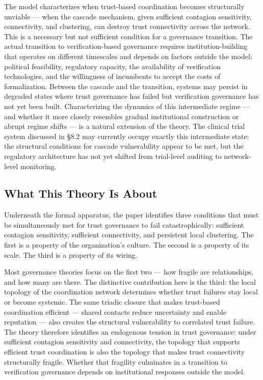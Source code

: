 \documentclass[11pt,a4paper]{article}
\begin{document}
The model characterizes when trust-based coordination becomes structurally unviable --- when the cascade mechanism, given sufficient contagion sensitivity, connectivity, and clustering, can destroy trust connectivity across the network. This is a necessary but not sufficient condition for a governance transition. The actual transition to verification-based governance requires institution-building that operates on different timescales and depends on factors outside the model: political feasibility, regulatory capacity, the availability of verification technologies, and the willingness of incumbents to accept the costs of formalization. Between the cascade and the transition, systems may persist in degraded states where trust governance has failed but verification governance has not yet been built. Characterizing the dynamics of this intermediate regime --- and whether it more closely resembles gradual institutional construction or abrupt regime shifts --- is a natural extension of the theory. The clinical trial system discussed in \S8.2 may currently occupy exactly this intermediate state: the structural conditions for cascade vulnerability appear to be met, but the regulatory architecture has not yet shifted from trial-level auditing to network-level monitoring.

\subsection{What This Theory Is About}

Underneath the formal apparatus, the paper identifies three conditions that must be simultaneously met for trust governance to fail catastrophically: sufficient contagion sensitivity, sufficient connectivity, and persistent local clustering. The first is a property of the organization's culture. The second is a property of its scale. The third is a property of its wiring.

Most governance theories focus on the first two --- how fragile are relationships, and how many are there. The distinctive contribution here is the third: the local topology of the coordination network determines whether trust failures stay local or become systemic. The same triadic closure that makes trust-based coordination efficient --- shared contacts reduce uncertainty and enable reputation --- also creates the structural vulnerability to correlated trust failure. The theory therefore identifies an endogenous tension in trust governance: under sufficient contagion sensitivity and connectivity, the topology that supports efficient trust coordination is also the topology that makes trust connectivity structurally fragile. Whether that fragility culminates in a transition to verification governance depends on institutional responses outside the model.
\end{document}
